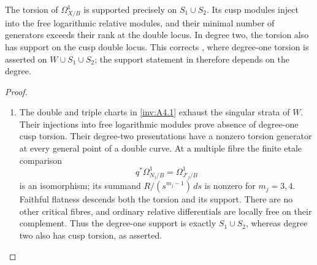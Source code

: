 \begin{proposition}\hypertarget{tag-01S1}{}\label{inv:A4.2}

The torsion of $\Omega_{X/B}^1$ is supported precisely on
$S_1\cup S_2$. Its cusp modules inject into the free logarithmic
relative modules, and their minimal number of generators exceeds
their rank at the double locus. In degree two, the torsion also
has support on the cusp double locus.
This corrects \cite[Remark~9.21, p.~81]{AC2026}, where
degree-one torsion is asserted on $W\cup S_1\cup S_2$;
the support statement in \cite[Remark~1.3, p.~5]{AC2026}
therefore depends on the degree.
\end{proposition}


\begin{proof}
\begin{enumerate}[label=\arabic*.,leftmargin=*]
\item The double and triple charts in \cref{inv:A4.1} exhaust the
singular strata of $W$. Their injections into free logarithmic
modules prove absence of degree-one cusp torsion. Their degree-two
presentations have a nonzero torsion generator at every general
point of a double curve. At a multiple fibre the finite etale
comparison
\[
q^*\Omega^1_{N_j/B}=\Omega^1_{J'_j/B}
\]
is an isomorphism; its summand $R/(s^{m_j-1})\,ds$ is nonzero
for $m_j=3,4$. Faithful flatness descends both the torsion and its
support. There are no other critical fibres, and ordinary relative
differentials are locally free on their complement. Thus the
degree-one support is exactly $S_1\cup S_2$, whereas degree two
also has cusp torsion, as asserted.
\end{enumerate}
\end{proof}